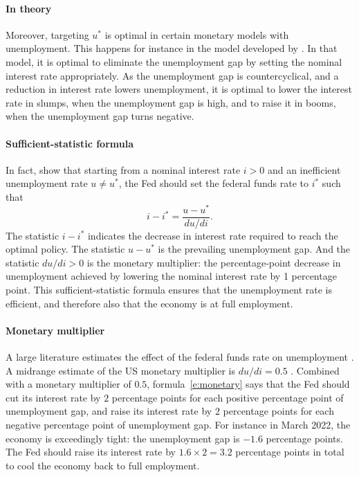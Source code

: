 \documentclass[letterpaper,12pt,leqno]{article}
\begin{document}
\paragraph{In theory} Moreover, targeting $u^*$ is optimal in certain monetary models with unemployment. This happens for instance in the model developed by \citet{MS19}. In that model, it is optimal to eliminate the unemployment gap by setting the nominal interest rate appropriately. As the unemployment gap is countercyclical, and a reduction in interest rate lowers unemployment, it is optimal to lower the interest rate in slumps, when the unemployment gap is high, and to raise it in booms, when the unemployment gap turns negative.

\paragraph{Sufficient-statistic formula} In fact, \citet[section 5]{MS19} show that starting from a nominal interest rate $i>0$ and an inefficient unemployment rate $u \neq u^*$, the Fed should set the federal funds rate to $i^*$ such that
\begin{equation}
 i - i^* =  \frac{u-u^*}{du/di}.
\label{e:monetary}\end{equation}
The statistic $i-i^*$ indicates the decrease in interest rate required to reach the optimal policy. The statistic $u-u^*$ is the prevailing unemployment gap. And the statistic $du/di>0$ is the monetary multiplier: the percentage-point decrease in unemployment achieved by lowering the nominal interest rate by 1 percentage point. This sufficient-statistic formula ensures that the unemployment rate is efficient, and therefore also that the economy is at full employment.

\paragraph{Monetary multiplier} A large literature estimates the effect of the federal funds rate on unemployment \citep{CEE99,C12,R15}. A midrange estimate of the US monetary multiplier is $du/di = 0.5$ \citep[p. 402]{MS19}. Combined with a monetary multiplier of $0.5$, formula~\eqref{e:monetary} says that the Fed should cut its interest rate by $2$ percentage points for each positive percentage point of unemployment gap, and raise its interest rate by $2$ percentage points for each negative percentage point of unemployment gap. For instance in March 2022, the economy is exceedingly tight: the unemployment gap is $-1.6$ percentage points. The Fed should raise its interest rate by $1.6\times 2 = 3.2$ percentage points in total to cool the economy back to full employment.
\end{document}
